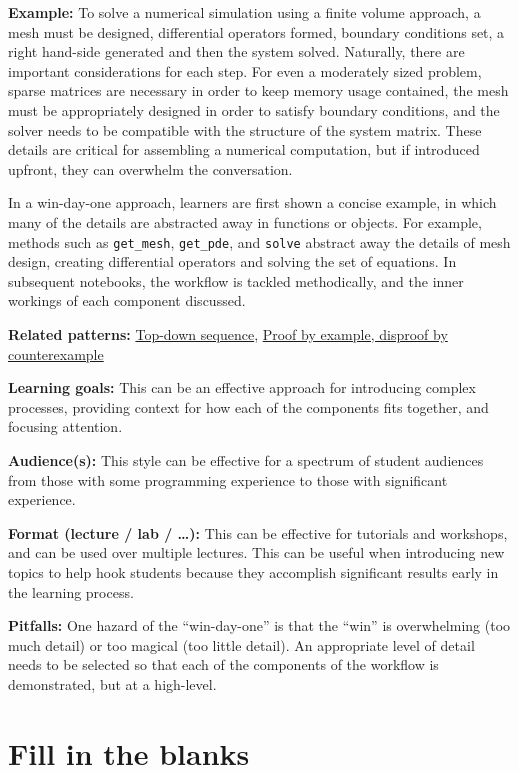 \documentclass[]{book}
\begin{document}
\textbf{Example:} To solve a numerical simulation using a finite volume
approach, a mesh must be designed, differential operators formed,
boundary conditions set, a right hand-side generated and then the system
solved. Naturally, there are important considerations for each step. For
even a moderately sized problem, sparse matrices are necessary in order
to keep memory usage contained, the mesh must be appropriately designed
in order to satisfy boundary conditions, and the solver needs to be
compatible with the structure of the system matrix. These details are
critical for assembling a numerical computation, but if introduced
upfront, they can overwhelm the conversation.

In a win-day-one approach, learners are first shown a concise example,
in which many of the details are abstracted away in functions or
objects. For example, methods such as \texttt{get\_mesh},
\texttt{get\_pde}, and \texttt{solve} abstract away the details of mesh
design, creating differential operators and solving the set of
equations. In subsequent notebooks, the workflow is tackled
methodically, and the inner workings of each component discussed.

\textbf{Related patterns:}
\protect\hyperlink{top-down-sequence}{Top-down sequence},
\protect\hyperlink{proof-by-example-disproof-by-counterexample}{Proof by
example, disproof by counterexample}

\textbf{Learning goals:} This can be an effective approach for
introducing complex processes, providing context for how each of the
components fits together, and focusing attention.

\textbf{Audience(s):} This style can be effective for a spectrum of
student audiences from those with some programming experience to those
with significant experience.

\textbf{Format (lecture / lab / \ldots{}):} This can be effective for
tutorials and workshops, and can be used over multiple lectures. This
can be useful when introducing new topics to help hook students because
they accomplish significant results early in the learning process.

\textbf{Pitfalls:} One hazard of the ``win-day-one'' is that the ``win''
is overwhelming (too much detail) or too magical (too little detail). An
appropriate level of detail needs to be selected so that each of the
components of the workflow is demonstrated, but at a high-level.

\section{Fill in the blanks}\label{fill-in-the-blanks}
\end{document}
